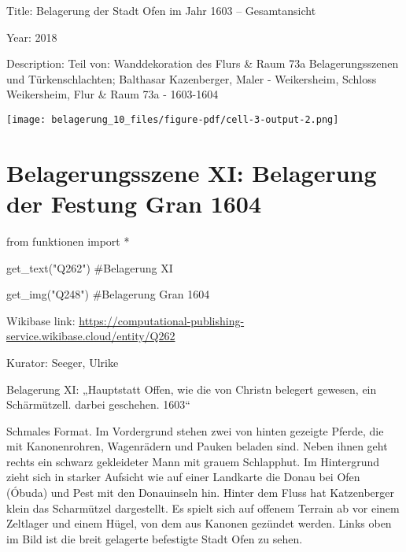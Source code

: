 \documentclass[
  a4paper,
  portrait]{book}
\newenvironment{Shaded}{\begin{snugshade}}{\end{snugshade}}
\newcommand{\CommentTok}[1]{\textcolor[rgb]{0.37,0.37,0.37}{#1}}
\newcommand{\ImportTok}[1]{\textcolor[rgb]{0.00,0.46,0.62}{#1}}
\newcommand{\NormalTok}[1]{\textcolor[rgb]{0.00,0.23,0.31}{#1}}
\newcommand{\OperatorTok}[1]{\textcolor[rgb]{0.37,0.37,0.37}{#1}}
\newcommand{\StringTok}[1]{\textcolor[rgb]{0.13,0.47,0.30}{#1}}
\begin{document}
Title: Belagerung der Stadt Ofen im Jahr 1603 -- Gesamtansicht

Year: 2018

Description: Teil von: Wanddekoration des Flurs \& Raum 73a
Belagerungsszenen und Türkenschlachten; Balthasar Kazenberger, Maler -
Weikersheim, Schloss Weikersheim, Flur \& Raum 73a - 1603-1604

\texttt{[image: belagerung\_10\_files/figure-pdf/cell-3-output-2.png]}

\chapter{Belagerungsszene XI: Belagerung der Festung Gran
1604}\label{belagerungsszene-xi-belagerung-der-festung-gran-1604}

\begin{Shaded}
\begin{Highlighting}[]
\ImportTok{from}\NormalTok{ funktionen }\ImportTok{import} \OperatorTok{*}
\end{Highlighting}
\end{Shaded}

\begin{Shaded}
\begin{Highlighting}[]
\NormalTok{get\_text(}\StringTok{"Q262"}\NormalTok{)}
\CommentTok{\#Belagerung XI}

\NormalTok{get\_img(}\StringTok{"Q248"}\NormalTok{)}
\CommentTok{\#Belagerung Gran 1604}
\end{Highlighting}
\end{Shaded}

Wikibase link:
\url{https://computational-publishing-service.wikibase.cloud/entity/Q262}

Kurator: Seeger, Ulrike

Belagerung XI: „Hauptstatt Offen, wie die von Christn belegert gewesen,
ein Schärmützell. darbei geschehen. 1603``

Schmales Format. Im Vordergrund stehen zwei von hinten gezeigte Pferde,
die mit Kanonenrohren, Wagenrädern und Pauken beladen sind. Neben ihnen
geht rechts ein schwarz gekleideter Mann mit grauem Schlapphut. Im
Hintergrund zieht sich in starker Aufsicht wie auf einer Landkarte die
Donau bei Ofen (Óbuda) und Pest mit den Donauinseln hin. Hinter dem
Fluss hat Katzenberger klein das Scharmützel dargestellt. Es spielt sich
auf offenem Terrain ab vor einem Zeltlager und einem Hügel, von dem aus
Kanonen gezündet werden. Links oben im Bild ist die breit gelagerte
befestigte Stadt Ofen zu sehen.
\end{document}
